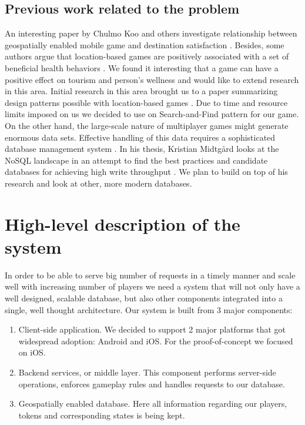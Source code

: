 \documentclass[conference]{IEEEtran}
\begin{document}
\subsection{Previous work related to the problem}
An interesting paper by Chulmo Koo and others investigate relationship between geospatially enabled mobile game and destination satisfaction \cite{destination-engagement}. Besides, some authors argue that location-based games are positively associated with a set of beneficial health behaviors \cite{pokemon-motivation}. We found it interesting that a game can have a positive effect on tourism and person’s wellness and would like to extend research in this area.  
   Initial research in this area brought us to a paper summarizing design patterns possible with location-based games \cite{location-based-mg}. Due to time and resource limits imposed on us we decided to use on Search-and-Find pattern for our game. On the other hand, the large-scale nature of multiplayer games might generate enormous data sets. Effective handling of this data requires a sophisticated database management system \cite{data-store-issues, location-based-services}. In his thesis, Kristian Midtgård looks at the NoSQL landscape in an attempt to find the best practices and candidate databases for achieving high write throughput \cite{massive-amounts-location-data}. We plan to build on top of his research and look at other, more modern databases. 
	
\section{High-level description of the system}
In order to be able to serve big number of requests in a timely manner and scale well with increasing number of players we need a system that will not only have a well designed, scalable database, but also other components integrated into a single, well thought architecture. Our system is built from 3 major components:

\begin{enumerate}
  \item Client-side application. We decided to support 2 major platforms that got widespread adoption: Android and iOS. For the proof-of-concept we focused on iOS. 
  \item Backend services, or middle layer. This component performs server-side operations, enforces gameplay rules and handles requests to our database. 
  \item Geospatially enabled database. Here all information regarding our players, tokens and corresponding states is being kept. 
\end{enumerate}
\end{document}
